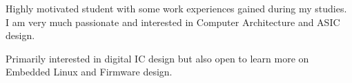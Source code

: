 

\begin{cvparagraph}

Highly motivated student with some work experiences gained during my studies.
I am very much passionate and interested in Computer Architecture and ASIC design.


Primarily interested in digital IC design but also open to learn more on Embedded Linux and Firmware design.

\end{cvparagraph}